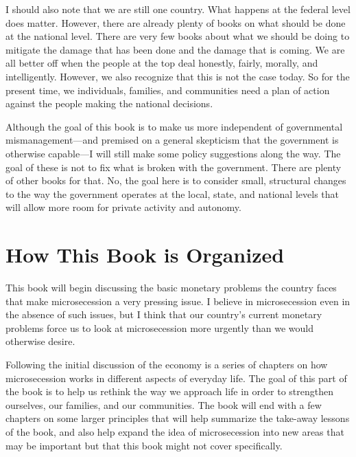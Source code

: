 \documentclass[letterpaper]{article}
\begin{document}
{\color{black}
I should also note that we are still one country. What happens at the
federal level does matter. However, there are already plenty of books
on what should be done at the national level. There are very few books
about what we should be doing to mitigate the damage that has been done
and the damage that is coming. We are all better off when the people at
the top deal honestly, fairly, morally, and intelligently. However, we
also recognize that this is not the case today. So for the present
time, we individuals, families, and communities need a plan of action
against the people making the national decisions.}

{\color{black}
Although the goal of this book is to make us more independent of
governmental
mismanagement\textcolor[rgb]{0.32941177,0.5529412,0.83137256}{—and
premised on a general skepticism that the government is otherwise
capable—}I will still make some policy suggestions along the way. The
goal of these is not to fix what is broken with the government. There
are plenty of other books for that. No, the goal here is to  consider
small, structural changes to the way the government operates at the
local, state, and national levels
\textcolor[rgb]{0.32941177,0.5529412,0.83137256}{that will} allow more
room for private activity and autonomy.}

\section{How This Book is Organized}
{\color{black}
This book will begin discussing the basic monetary problems the country
faces that make microsecession a very pressing issue. I believe in
microsecession even in the absence of such issues, but I think that
\textcolor[rgb]{0.32941177,0.5529412,0.83137256}{our country’s} current
monetary problems
\textcolor[rgb]{0.32941177,0.5529412,0.83137256}{force us to look at
microsecession m}ore urgently than we would otherwise desire. }

{\color{black}
Following the initial discussion of the economy is a series of chapters
on how microsecession works in different aspects of
\textcolor[rgb]{0.32941177,0.5529412,0.83137256}{everyday life}. The
goal of this part of the book is to help us rethink the way we approach
life in order to strengthen ourselves, our families, and our
communities. The book will end with a few chapters on some larger
principles that will help summarize the take-away lessons of the book,
and also help expand the idea of microsecession into new areas
\textcolor[rgb]{0.32941177,0.5529412,0.83137256}{that may be important
but that this book might not cover specifically.}}
\end{document}
